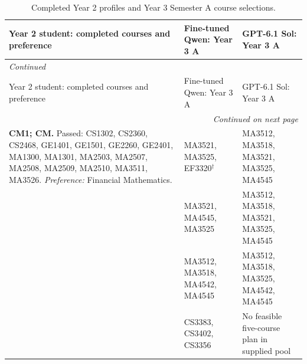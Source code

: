\documentclass{article}
\begin{document}
{\small
\setlength{\tabcolsep}{4pt}
\renewcommand{\arraystretch}{1.12}
\begin{longtable}{p{2.45in}p{1.35in}p{1.35in}}
\caption{Completed Year 2 profiles and Year 3 Semester A course selections.}\label{tab:year3-input06}\\
\toprule
Year 2 student: completed courses and preference & Fine-tuned Qwen: Year 3 A & GPT-6.1 Sol: Year 3 A\\
\midrule
\endfirsthead
\multicolumn{3}{l}{\textit{Continued}}\\
\toprule
Year 2 student: completed courses and preference & Fine-tuned Qwen: Year 3 A & GPT-6.1 Sol: Year 3 A\\
\midrule
\endhead
\midrule
\multicolumn{3}{r}{\textit{Continued on next page}}\\
\endfoot
\bottomrule
\endlastfoot
{\raggedright \textbf{CM1; CM.} Passed: CS1302, CS2360, CS2468, GE1401, GE1501, GE2260, GE2401, MA1300, MA1301, MA2503, MA2507, MA2508, MA2509, MA2510, MA3511, MA3526. \textit{Preference:} Financial Mathematics.\par} & {\raggedright MA3521, MA3525, EF3320$^{\dagger}$\par} & {\raggedright MA3512, MA3518, MA3521, MA3525, MA4545\par}\\
\addlinespace[3pt]
{\raggedright \textbf{CM2; CM.} Passed: CS1302, CS2360, CS2468, GE1401, GE1501, GE2260, GE2401, MA1300, MA1301, MA2503, MA2507, MA2508, MA2509, MA2510, MA3511. \textit{Preference:} Financial Mathematics.\par} & {\raggedright MA3521, MA4545, MA3525\par} & {\raggedright MA3512, MA3518, MA3521, MA3525, MA4545\par}\\
\addlinespace[3pt]
{\raggedright \textbf{CM3; CM.} Passed: CS1302, CS2360, CS2468, GE1401, GE1501, GE2260, GE2401, MA1300, MA1301, MA2503, MA2507, MA2508, MA2509, MA2510, MA3511, MA3526. \textit{Preference:} Enriched Mathematics.\par} & {\raggedright MA3512, MA3518, MA4542, MA4545\par} & {\raggedright MA3512, MA3518, MA3525, MA4542, MA4545\par}\\
\addlinespace[3pt]
{\raggedright \textbf{CS1; CS.} Passed: CS1302A, CS2115, CS2310, CS2312, CS2402, CS3103, CS3201, CS3334, CS3342, GE1401, GE1501, GE1601, GE2340, MA1503, MA1508, MA2185. \textit{Preference:} Artificial Intelligence.\par} & {\raggedright CS3383, CS3402, CS3356\par} & {\raggedright No feasible five-course plan in supplied pool\par}\\

\end{longtable}}
\end{document}
